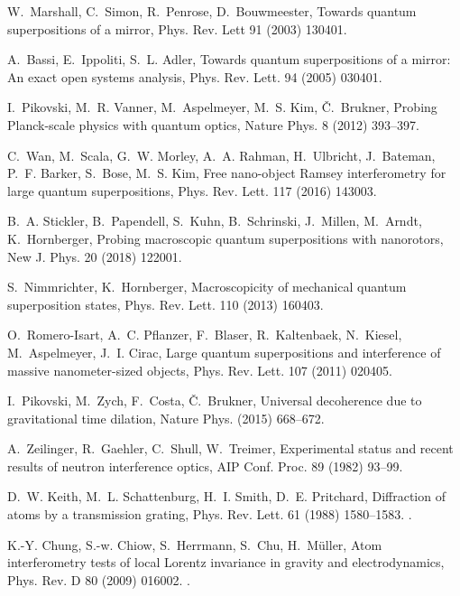 \documentclass[3p,sort&compress]{elsarticle}
\begin{document}
\begin{thebibliography}{100}
W.~Marshall, C.~Simon, R.~Penrose, D.~Bouwmeester, Towards quantum
  superpositions of a mirror, Phys. Rev. Lett 91 (2003) 130401.

A.~Bassi, E.~Ippoliti, S.~L. Adler, Towards quantum superpositions of a mirror:
  An exact open systems analysis, Phys. Rev. Lett. 94 (2005) 030401.

I.~Pikovski, M.~R. Vanner, M.~Aspelmeyer, M.~S. Kim, {\v C}.~Brukner, Probing
  {P}lanck-scale physics with quantum optics, Nature Phys. 8 (2012) 393--397.

C.~Wan, M.~Scala, G.~W. Morley, A.~A. Rahman, H.~Ulbricht, J.~Bateman, P.~F.
  Barker, S.~Bose, M.~S. Kim, Free nano-object {R}amsey interferometry for
  large quantum superpositions, Phys. Rev. Lett. 117 (2016) 143003.

B.~A. Stickler, B.~Papendell, S.~Kuhn, B.~Schrinski, J.~Millen, M.~Arndt,
  K.~Hornberger, Probing macroscopic quantum superpositions with nanorotors,
  New J. Phys. 20 (2018) 122001.

S.~Nimmrichter, K.~Hornberger, Macroscopicity of mechanical quantum
  superposition states, Phys. Rev. Lett. 110 (2013) 160403.

O.~Romero-Isart, A.~C. Pflanzer, F.~Blaser, R.~Kaltenbaek, N.~Kiesel,
  M.~Aspelmeyer, J.~I. Cirac, Large quantum superpositions and interference of
  massive nanometer-sized objects, Phys. Rev. Lett. 107 (2011) 020405.

I.~Pikovski, M.~Zych, F.~Costa, {\v C}.~Brukner, Universal decoherence due to
  gravitational time dilation, Nature Phys. (2015) 668--672.

A.~Zeilinger, R.~Gaehler, C.~Shull, W.~Treimer, Experimental status and recent
  results of neutron interference optics, AIP Conf. Proc. 89 (1982) 93--99.

D.~W. Keith, M.~L. Schattenburg, H.~I. Smith, D.~E. Pritchard, Diffraction of
  atoms by a transmission grating, Phys. Rev. Lett. 61 (1988) 1580--1583.
\newblock \href {http://dx.doi.org/10.1103/PhysRevLett.61.1580}
  {}.

K.-Y. Chung, S.-w. Chiow, S.~Herrmann, S.~Chu, H.~M\"uller, Atom interferometry
  tests of local {L}orentz invariance in gravity and electrodynamics, Phys.
  Rev. D 80 (2009) 016002.
\newblock \href {http://dx.doi.org/10.1103/PhysRevD.80.016002}
  {}.


\end{thebibliography}
\end{document}
